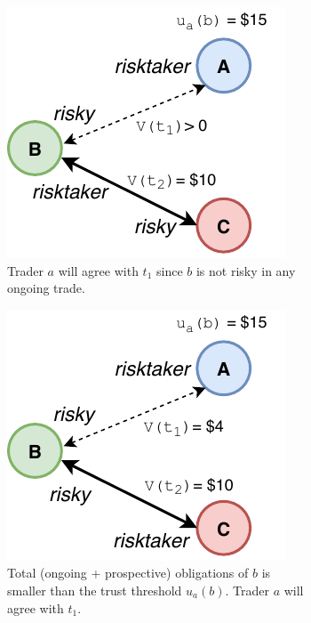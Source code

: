 \begin{figure}[t]
	\centering
	\begin{subfigure}[t]{.4\textwidth}
		\centering
		\captionsetup{width=.9\linewidth}
		\includegraphics[width=.7\linewidth]{xchange/assets/trade_restriction_1}
		\caption{Trader $ a $ will agree with $ t_1 $ since $ b $ is not risky in any ongoing trade.}
		\label{fig:trade_restriction_1}
	\end{subfigure}%
	\begin{subfigure}[t]{.4\textwidth}
		\centering
		\captionsetup{width=.9\linewidth}
		\includegraphics[width=.7\linewidth]{xchange/assets/trade_restriction_2}
		\caption{Total (ongoing + prospective) obligations of $ b $ is smaller than the trust threshold $ u_a(b) $. Trader $ a $ will agree with $ t_1 $.}
		\label{fig:trade_restriction_2}
	\end{subfigure}\vspace{0.5cm}
	\begin{subfigure}[t]{.4\textwidth}

\end{subfigure}
\end{figure}
